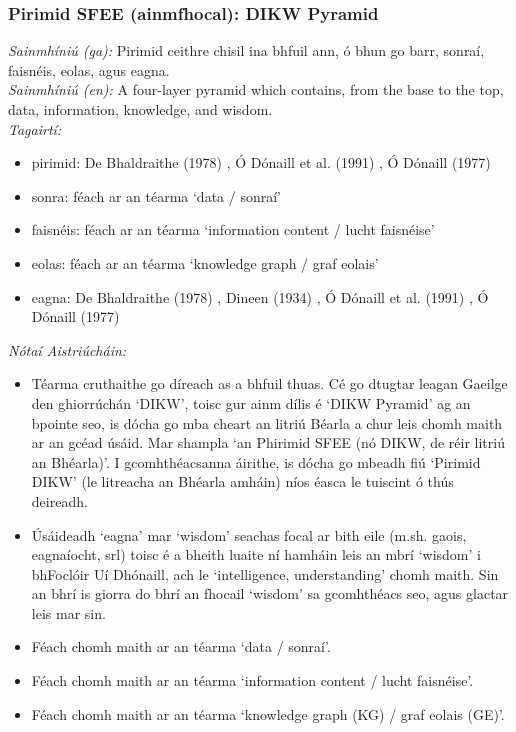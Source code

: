 \documentclass{article}
\begin{document}
\subsubsection*{Pirimid SFEE (ainmfhocal): DIKW Pyramid}
 \noindent \textit{Sainmhíniú (ga):} Pirimid ceithre chisil ina bhfuil ann, ó bhun go barr, sonraí, faisnéis, eolas, agus eagna.
\\
 \noindent \textit{Sainmhíniú (en):} A four-layer pyramid which contains, from the base to the top, data, information, knowledge, and wisdom.
\\
 \noindent \textit{Tagairtí:}
\begin{itemize}
	\item pirimid: De Bhaldraithe (1978) \cite{de-bhaldraithe}, Ó Dónaill et al. (1991) \cite{focloir-beag}, Ó Dónaill (1977) \cite{odonaill}
	\item sonra: féach ar an téarma `data / sonraí'
	\item faisnéis: féach ar an téarma `information content / lucht faisnéise'
	\item eolas: féach ar an téarma `knowledge graph / graf eolais'
	\item eagna: De Bhaldraithe (1978) \cite{de-bhaldraithe}, Dineen (1934) \cite{dineen}, Ó Dónaill et al. (1991) \cite{focloir-beag}, Ó Dónaill (1977) \cite{odonaill}
\end{itemize}

 \noindent \textit{Nótaí Aistriúcháin:}
\begin{itemize}
	\item Téarma cruthaithe go díreach as a bhfuil thuas. Cé go dtugtar leagan Gaeilge den ghiorrúchán `DIKW', toisc gur ainm dílis é `DIKW Pyramid' ag an bpointe seo, is dócha go mba cheart an litriú Béarla a chur leis chomh maith ar an gcéad úsáid. Mar shampla `an Phirimid SFEE (nó DIKW, de réir litriú an Bhéarla)'. I gcomhthéacsanna áirithe, is dócha go mbeadh fiú `Pirimid DIKW' (le litreacha an Bhéarla amháin) níos éasca le tuiscint ó thús deireadh.
	\item Úsáideadh `eagna' mar `wisdom' seachas focal ar bith eile (m.sh. gaois, eagnaíocht, srl) toisc é a bheith luaite ní hamháin leis an mbrí `wisdom' i bhFoclóir Uí Dhónaill, ach le `intelligence, understanding' chomh maith. Sin an bhrí is giorra do bhrí an fhocail `wisdom' sa gcomhthéacs seo, agus glactar leis mar sin.
	\item Féach chomh maith ar an téarma `data / sonraí'.
	\item Féach chomh maith ar an téarma `information content / lucht faisnéise'.
	\item Féach chomh maith ar an téarma `knowledge graph (KG) / graf eolais (GE)'.
\end{itemize}
\end{document}
